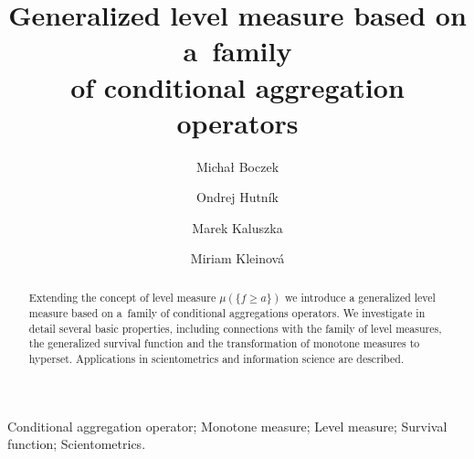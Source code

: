 \documentclass[preprint,11pt]{elsarticle}
\theoremstyle{definition}
\renewcommand\ge{\geqslant}
\begin{document}
\begin{frontmatter}

\title{Generalized level measure based on a~family \\of conditional aggregation operators}


\author{Micha{\l} Boczek}

\author{Ondrej Hutn\'ik}


\author{Marek Kaluszka}
\author{Miriam Kleinov\'{a}}

\address[label1]{Institute of Mathematics, Lodz University of Technology, 90-924 Lodz, Poland}
\address[label2]{Institute of Mathematics, Pavol Jozef \v Saf\'arik University in Ko\v sice, 040-01 Ko\v sice, Slovakia}


\begin{abstract}
Extending the concept of level measure $\mu(\{f\ge a\})$ we introduce a generalized level measure based on a~family of conditional aggregations operators.
We investigate in detail several basic properties, including connections with the family of level measures, the generalized survival function and the transformation of monotone measures to hyperset. Applications in scientometrics and information science are described.
\end{abstract}

\begin{keyword}
Conditional aggregation operator;  Monotone measure;  Level measure; Survival function; Scientometrics.
\end{keyword}

\end{frontmatter}
\end{document}
